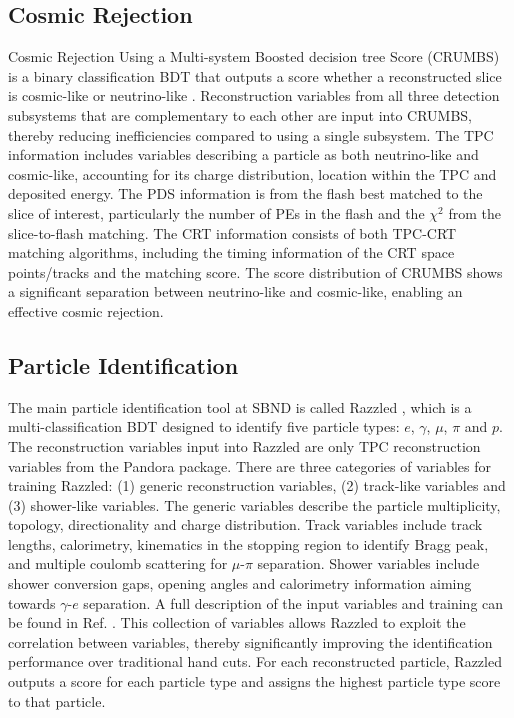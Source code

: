 \subsection{Cosmic Rejection}
\label{sec:crumbs}

Cosmic Rejection Using a Multi-system Boosted decision tree Score (CRUMBS) is a binary classification BDT that outputs a score whether a reconstructed slice is cosmic-like or neutrino-like \cite{crumbs}. 
Reconstruction variables from all three detection subsystems that are complementary to each other are input into CRUMBS, thereby reducing inefficiencies compared to using a single subsystem.
The TPC information includes variables describing a particle as both neutrino-like and cosmic-like, accounting for its charge distribution, location within the TPC and deposited energy.  
The PDS information is from the flash best matched to the slice of interest, particularly the number of PEs in the flash and the $\chi^{2}$ from the slice-to-flash matching.                        
The CRT information consists of both TPC-CRT matching algorithms, including the timing information of the CRT space points/tracks and the matching score.
The score distribution of CRUMBS shows a significant separation between neutrino-like and cosmic-like, enabling an effective cosmic rejection.


\subsection{Particle Identification}
\label{sec:razzled}

The main particle identification tool at SBND is called Razzled \cite{razzled}, which is a multi-classification BDT designed to identify five particle types: $e$, $\gamma$, $\mu$, $\pi$ and $p$.
The reconstruction variables input into Razzled are only TPC reconstruction variables from the Pandora package.
There are three categories of variables for training Razzled: (1) generic reconstruction variables, (2) track-like variables and (3) shower-like variables.
The generic variables describe the particle multiplicity, topology, directionality and charge distribution.
Track variables include track lengths, calorimetry, kinematics in the stopping region to identify Bragg peak, and multiple coulomb scattering for $\mu$-$\pi$ separation.
Shower variables include shower conversion gaps, opening angles and calorimetry information aiming towards $\gamma$-$e$ separation.
A full description of the input variables and training can be found in Ref. \cite{EdPhD}.
This collection of variables allows Razzled to exploit the correlation between variables, thereby significantly improving the identification performance over traditional hand cuts.
For each reconstructed particle, Razzled outputs a score for each particle type and assigns the highest particle type score to that particle.

